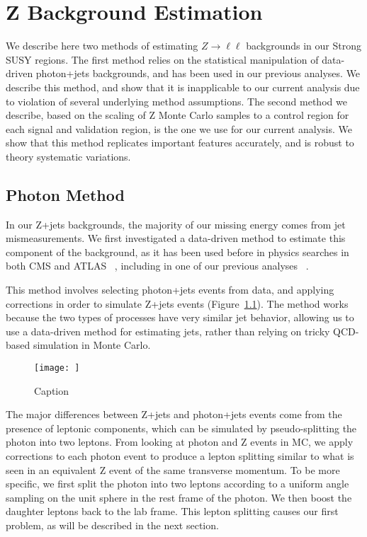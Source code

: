 \chapter{Z Background Estimation}

We describe here two methods of estimating $Z\rightarrow\ell\ell$ backgrounds in our Strong SUSY regions. The first method relies on the statistical manipulation of data-driven photon+jets backgrounds, and has been used in our previous analyses. We describe this method, and show that it is inapplicable to our current analysis due to violation of several underlying method assumptions. The second method we describe, based on the scaling of Z Monte Carlo samples to a \dPhi control region for each signal and validation region, is the one we use for our current analysis. We show that this method replicates important features accurately, and is robust to theory systematic variations.

\section{Photon Method}

In our Z+jets backgrounds, the majority of our missing energy comes from jet mismeasurements. We first investigated a data-driven method to estimate this component of the background, as it has been used before in physics searches in both CMS and ATLAS ~\cite{blah}, including in one of our previous analyses ~\cite{blah}.

This method involves selecting photon+jets events from data, and applying corrections in order to simulate Z+jets events (Figure~\ref{fig:photon_to_Z}). The method works because the two types of processes have very similar jet behavior, allowing us to use a data-driven method for estimating jets, rather than relying on tricky QCD-based simulation in Monte Carlo.

\begin{figure}
    \centering
    \texttt{[image: ]}
    \caption{Caption}
    \label{fig:photon_to_Z}
\end{figure}

The major differences between Z+jets and photon+jets events come from the presence of leptonic components, which can be simulated by pseudo-splitting the photon into two leptons. From looking at photon and Z events in MC, we apply corrections to each photon event to produce a lepton splitting similar to what is seen in an equivalent Z event of the same transverse momentum. To be more specific, we first split the photon into two leptons according to a uniform angle sampling on the unit sphere in the rest frame of the photon. We then boost the daughter leptons back to the lab frame. This lepton splitting causes our first problem, as will be described in the next section.

